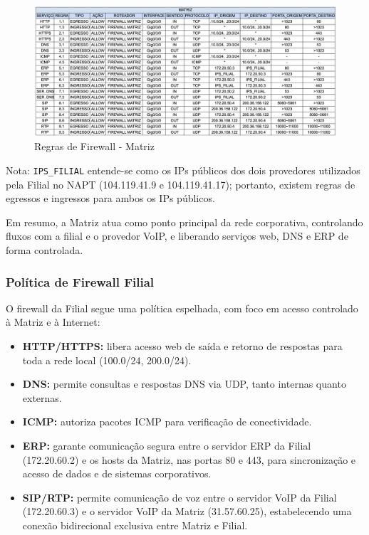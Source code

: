 \documentclass[a4paper, 12pt]{article}
\begin{document}
\begin{figure}[H]
    \centering
    \includegraphics[width=1\linewidth]{tabela-matriz.png}
    \caption{Regras de Firewall - Matriz}
    \label{fig:placeholder}
\end{figure}

Nota: \texttt{IPS\_FILIAL} entende-se como os IPs públicos dos dois provedores utilizados pela Filial no NAPT (104.119.41.9 e 104.119.41.17); portanto, existem regras de egressos e ingressos para ambos os IPs públicos.

Em resumo, a Matriz atua como ponto principal da rede corporativa, controlando fluxos com a filial e o provedor VoIP, e liberando serviços web, DNS e ERP de forma controlada.

\subsubsection{Política de Firewall Filial}

O firewall da Filial segue uma política espelhada, com foco em acesso controlado à Matriz e à Internet:

\begin{itemize}
    \item \textbf{HTTP/HTTPS:} libera acesso web de saída e retorno de respostas para toda a rede local (100.0/24, 200.0/24).
    \item \textbf{DNS:} permite consultas e respostas DNS via UDP, tanto internas quanto externas.
    \item \textbf{ICMP:} autoriza pacotes ICMP para verificação de conectividade.
    \item \textbf{ERP:} garante comunicação segura entre o servidor ERP da Filial (172.20.60.2) e os hosts da Matriz, nas portas 80 e 443, para sincronização e acesso de dados e de sistemas corporativos.
    \item \textbf{SIP/RTP:} permite comunicação de voz entre o servidor VoIP da Filial (172.20.60.3) e o servidor VoIP da Matriz (31.57.60.25), estabelecendo uma conexão bidirecional exclusiva entre Matriz e Filial.
\end{itemize}
\end{document}
